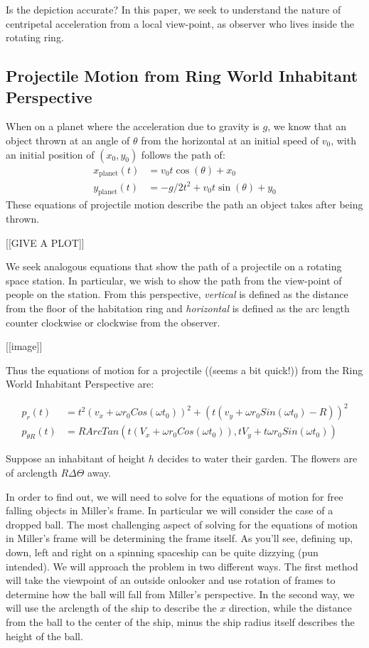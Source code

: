 \documentclass{amsart}
\theoremstyle{definition}
\begin{document}
Is the depiction accurate? In this paper, we seek to understand the
nature of centripetal acceleration from a local view-point, as observer
who lives inside the rotating ring.

\subsection{Projectile Motion from Ring World Inhabitant Perspective}


When on a planet where the acceleration due to gravity is $g$, we know
that an object thrown at an angle of $\theta$ from the horizontal at
an initial speed of $v_0$, with an initial position of $(x_0,y_0)$
follows the path of:
\begin{align*}
  x_{\mathrm{planet}}(t) &=  v_0 t \cos(\theta)  + x_0\\
  y_{\mathrm{planet}}(t) &=  -g/2 t^2 + v_0 t \sin(\theta)  + y_0
\end{align*}
These equations of projectile motion describe the path an object takes
after being thrown.

[[GIVE A PLOT]]

We seek analogous equations that show the path of a projectile on a
rotating space station. In particular, we wish to show the path from
the view-point of people on the station.  From this perspective,
\textit{vertical} is defined as the distance from the floor of the
habitation ring and \textit{horizontal} is defined as the arc length
counter clockwise or clockwise from the observer.

[[image]]


Thus the equations of motion for a projectile ((seems a bit quick!))
from the Ring World Inhabitant Perspective are:

\begin{align*}
  p_{r}(t) &= t^2 (v_x + \omega r_0 Cos(\omega t_0))^2 + (t(v_y + \omega
  r_0 Sin(\omega t_0) - R))^2\\
  p_{\theta R}(t) &=R ArcTan(t(V_x + \omega r_0 Cos(\omega t_0)),tV_y +
                    t \omega r_0 Sin(\omega t_0))
\end{align*}


Suppose an inhabitant of height $h$ decides to water their garden. The flowers are of arclength $R\Delta\Theta$ away. 

In order to find out, we will need to solve for the equations of
motion for free falling objects in Miller's frame. In particular we
will consider the case of a dropped ball. The most challenging aspect
of solving for the equations of motion in Miller's frame will be
determining the frame itself. As you'll see, defining up, down, left
and right on a spinning spaceship can be quite dizzying (pun
intended). We will approach the problem in two different ways. The
first method will take the viewpoint of an outside onlooker and use
rotation of frames to determine how the ball will fall from Miller's
perspective. In the second way, we will use the arclength of the ship
to describe the $x$ direction, while the distance from the ball to the
center of the ship, minus the ship radius itself describes the height
of the ball.
\end{document}
